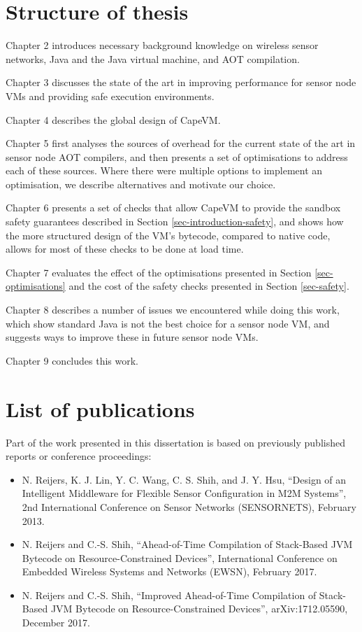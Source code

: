 \section{Structure of thesis}
Chapter 2 introduces necessary background knowledge on wireless sensor networks, Java and the Java virtual machine, and AOT compilation.

Chapter 3 discusses the state of the art in improving performance for sensor node VMs and providing safe execution environments.

Chapter 4 describes the global design of CapeVM.

Chapter 5 first analyses the sources of overhead for the current state of the art in sensor node AOT compilers, and then presents a set of optimisations to address each of these sources. Where there were multiple options to implement an optimisation, we describe alternatives and motivate our choice.

Chapter 6 presents a set of checks that allow CapeVM to provide the sandbox safety guarantees described in Section \ref{sec-introduction-safety}, and shows how the more structured design of the VM's bytecode, compared to native code, allows for most of these checks to be done at load time.

Chapter 7 evaluates the effect of the optimisations presented in Section \ref{sec-optimisations} and the cost of the safety checks presented in Section \ref{sec-safety}.

Chapter 8 describes a number of issues we encountered while doing this work, which show standard Java is not the best choice for a sensor node VM, and suggests ways to improve these in future sensor node VMs.

Chapter 9 concludes this work.

\section{List of publications}
Part of the work presented in this dissertation is based on previously published reports or conference proceedings:

\begin{itemize}
    \item N. Reijers, K. J. Lin, Y. C. Wang, C. S. Shih, and J. Y. Hsu, “Design of an Intelligent Middleware for Flexible Sensor Configuration in M2M Systems”, 2nd International Conference on Sensor Networks (SENSORNETS), February 2013.
    \item N. Reijers and C.-S. Shih, “Ahead-of-Time Compilation of Stack-Based JVM Bytecode on Resource-Constrained Devices”, International Conference on Embedded Wireless Systems and Networks (EWSN), February 2017.
    \item N. Reijers and C.-S. Shih, “Improved Ahead-of-Time Compilation of Stack-Based JVM Bytecode on Resource-Constrained Devices”, arXiv:1712.05590, December 2017.
\end{itemize}

